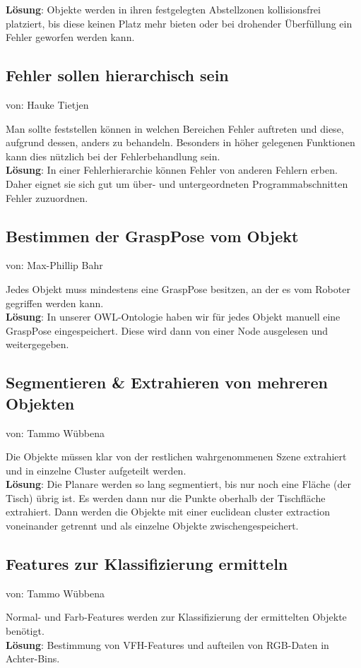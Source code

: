\documentclass{suturo}
\makeatletter
\newcommand{\chapterauthor}[1]{%
  {\parindent0pt\vspace*{-27pt}%
  \linespread{0}\small\begin{flushright}von: #1\end{flushright}%
  \par\nobreak\vspace*{0pt}}
  \@afterheading%
}
\makeatother
\begin{document}
\textbf{Lösung}: Objekte werden in ihren festgelegten Abstellzonen kollisionsfrei platziert, bis diese keinen Platz mehr bieten oder bei drohender Überfüllung ein Fehler geworfen werden kann.


\subsection{Fehler sollen hierarchisch sein}
\chapterauthor{Hauke Tietjen}
Man sollte feststellen können in welchen Bereichen Fehler auftreten und diese, aufgrund dessen, anders zu behandeln. Besonders in höher gelegenen Funktionen kann dies nützlich bei der Fehlerbehandlung sein. \\

\textbf{Lösung}: In einer Fehlerhierarchie können Fehler von anderen Fehlern erben. Daher eignet sie sich gut um über- und untergeordneten Programmabschnitten Fehler zuzuordnen.

\subsection{Bestimmen der GraspPose vom Objekt}
\chapterauthor{Max-Phillip Bahr}
Jedes Objekt muss mindestens eine GraspPose besitzen, an der es vom Roboter gegriffen werden kann.\\

\textbf{Lösung}: In unserer OWL-Ontologie haben wir für jedes Objekt manuell eine GraspPose eingespeichert. Diese wird dann von einer Node ausgelesen und weitergegeben.

\subsection{Segmentieren \& Extrahieren von mehreren Objekten}
\chapterauthor{Tammo Wübbena}
Die Objekte müssen klar von der restlichen wahrgenommenen Szene extrahiert und in einzelne Cluster aufgeteilt werden.\\
\textbf{Lösung}: Die Planare werden so lang segmentiert, bis nur noch eine Fläche (der Tisch) übrig ist. Es werden dann nur die Punkte oberhalb der Tischfläche extrahiert. Dann werden die Objekte mit einer euclidean cluster extraction voneinander getrennt und als einzelne Objekte zwischengespeichert.

\subsection{Features zur Klassifizierung ermitteln}
\chapterauthor{Tammo Wübbena}
Normal- und Farb-Features werden zur Klassifizierung der ermittelten Objekte benötigt. \\
\textbf{Lösung}: Bestimmung von VFH-Features und aufteilen von RGB-Daten in Achter-Bins.
\end{document}
